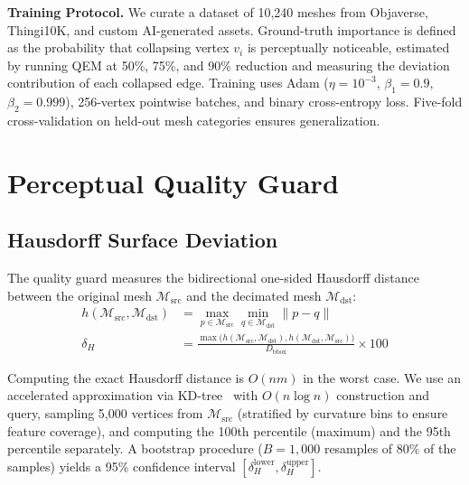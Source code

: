\documentclass[10pt, twocolumn, a4paper]{article}
\newcommand{\calM}{\mathcal{M}}
\begin{document}
\noindent\textbf{Training Protocol.}
We curate a dataset of 10,240 meshes from Objaverse, Thingi10K, and
custom AI-generated assets. Ground-truth importance is defined as
the probability that collapsing vertex $v_i$ is perceptually
noticeable, estimated by running QEM at 50\%, 75\%, and 90\%
reduction and measuring the deviation contribution of each
collapsed edge. Training uses Adam ($\eta = 10^{-3}$,
$\beta_1 = 0.9$, $\beta_2 = 0.999$), 256-vertex pointwise batches,
and binary cross-entropy loss. Five-fold cross-validation on held-out
mesh categories ensures generalization.

\section{Perceptual Quality Guard}
\label{sec:perceptual}

\subsection{Hausdorff Surface Deviation}
The quality guard measures the bidirectional one-sided Hausdorff
distance between the original mesh $\calM_{\text{src}}$ and the
decimated mesh $\calM_{\text{dst}}$:
\begin{align}
  \label{eq:hausdorff}
  h(\calM_{\text{src}}, \calM_{\text{dst}}) &=
  \max_{p \in \calM_{\text{src}}} \min_{q \in \calM_{\text{dst}}}
  \|p - q\| \\
  \delta_H &= \frac{\max\big(h(\calM_{\text{src}},\calM_{\text{dst}}),
    h(\calM_{\text{dst}},\calM_{\text{src}})\big)}
    {D_{\text{bbox}}} \times 100
\end{align}

Computing the exact Hausdorff distance is $O(nm)$ in the worst case.
We use an accelerated approximation via KD-tree~\cite{manewongvatana2002optimizing}
with $O(n\log n)$ construction and query, sampling 5,000
vertices from $\calM_{\text{src}}$ (stratified by curvature bins to
ensure feature coverage), and computing the 100th percentile
(maximum) and the 95th percentile separately. A bootstrap
procedure ($B = 1{,}000$ resamples of 80\% of the samples) yields
a 95\% confidence interval $[\delta_H^{\text{lower}},
\delta_H^{\text{upper}}]$.
\end{document}
